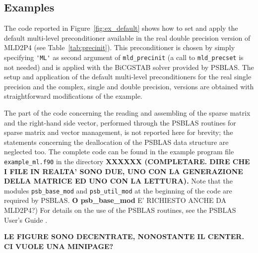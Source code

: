 \subsection{Examples\label{sec:examples}}

The code reported in Figure~\ref{fig:ex_default} shows how to set and apply the default
multi-level preconditioner available in the real double precision version
of MLD2P4 (see Table~\ref{tab:precinit}). This preconditioner is chosen
by simply specifying \verb|'ML'| as second argument of \verb|mld_precinit|
(a call to \verb|mld_precset| is not needed) and is applied with the BiCGSTAB
solver provided by PSBLAS. The setup and application of the default multi-level
preconditioners for the real single precision and the complex, single and double
precision, versions are obtained with straightforward modifications of the example.
 

The part of the code concerning the
reading and assembling of the sparse matrix and the right-hand side vector, performed
through the PSBLAS routines for sparse matrix and vector management, is not reported
here for brevity; the statements concerning the deallocation of the PSBLAS data structure
are neglected too.
The complete code can be found in the example program file \verb|example_ml.f90|
in the directory \textbf{XXXXXX (COMPLETARE. DIRE CHE I FILE IN REALTA' SONO DUE, UNO CON
LA GENERAZIONE DELLA MATRICE ED UNO CON LA LETTURA).} Note that the modules \verb|psb_base_mod|
and \verb|psb_util_mod| at the beginning of the code are required by PSBLAS.
\textbf{O psb\_base\_mod} E' RICHIESTO ANCHE DA MLD2P4?)
For details on the use of the PSBLAS routines, see the PSBLAS User's Guide \cite{PSBLASGUIDE}.

\textbf{LE FIGURE SONO DECENTRATE, NONOSTANTE IL CENTER. CI VUOLE UNA MINIPAGE?}

